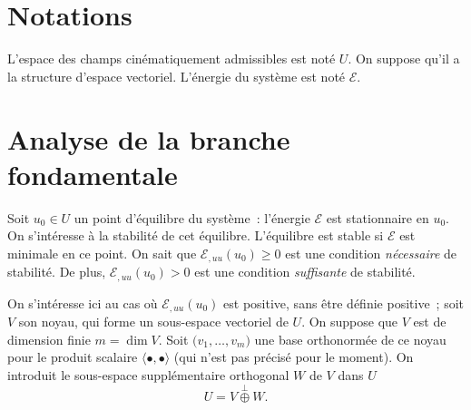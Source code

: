 \documentclass[12pt, final]{amsart}
\begin{document}
\title{\mytitle}
\author{\myauthor}
\address{\myaddress}

\begin{abstract}
  blabla
\end{abstract}


\maketitle


\section{Notations}

L'espace des champs cinématiquement admissibles est noté \(U\). On suppose
qu'il a la structure d'espace vectoriel. L'énergie du système est noté
\(\mathcal E\).

\section{Analyse de la branche fondamentale}

Soit \(u_0\in U\) un point d'équilibre du système~: l'énergie \(\mathcal E\)
est stationnaire en \(u_0\). On s'intéresse à la stabilité de cet
équilibre. L'équilibre est stable si \(\mathcal E\) est minimale en ce
point. On sait que \(\mathcal E_{,uu}(u_0)\geq0\) est une condition
\emph{nécessaire} de stabilité. De plus, \(\mathcal E_{,uu}(u_0)>0\) est une
condition \emph{suffisante} de stabilité.

On s'intéresse ici au cas où \(\mathcal E_{,uu}(u_0)\) est positive, sans être
définie positive~; soit \(V\) son noyau, qui forme un sous-espace vectoriel de
\(U\). On suppose que \(V\) est de dimension finie \(m=\dim V\). Soit
\(\bigl(v_1, \ldots, v_m\bigr)\) une base orthonormée de ce noyau pour le
produit scalaire \(\langle\bullet,\bullet\rangle\) (qui n'est pas précisé pour
le moment). On introduit le sous-espace supplémentaire orthogonal \(W\) de
\(V\) dans \(U\)
\begin{equation}
  U=V\stackrel{\perp}{\oplus} W.
\end{equation}
\end{document}
